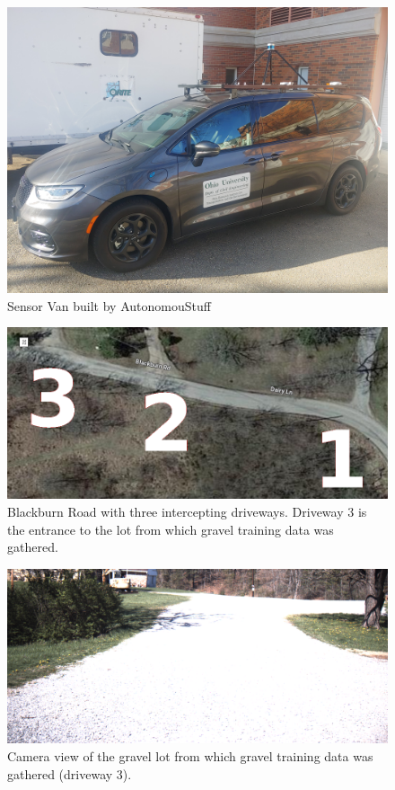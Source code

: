 \documentclass[numbered,pdftex]{ohio-etd}
\begin{document}
{{%
%		
		\begin{figure}[H]
			\centering
			\includegraphics[width=0.7\linewidth]{Defense_Images/van_on_van}
			\caption[Sensor Van]{Sensor Van built by AutonomouStuff}
			\label{fig:Experimental_Apperatus_in_Results}
		\end{figure}
		
		\begin{figure}[H]
			\centering
			\includegraphics[width=0.65\linewidth]{Defense_Images/three_driveways_sat}
			\caption[Blackburn Road Overlays]{Blackburn Road with three intercepting driveways. Driveway $3$ is the entrance to the lot from which gravel training data was gathered. }
			\label{fig:road_areas_annotated_2}
		\end{figure}
		
		\begin{figure}[H]
			\centering
			\includegraphics[width=0.75\linewidth]{Defense_Images/gravel_training_lot}
			\caption[Gravel Training Lot]{Camera view of the gravel lot from which gravel training data was gathered (driveway 3).}
			\label{fig:gravel_training_lot_in_results}
		\end{figure}

}}
\end{document}
